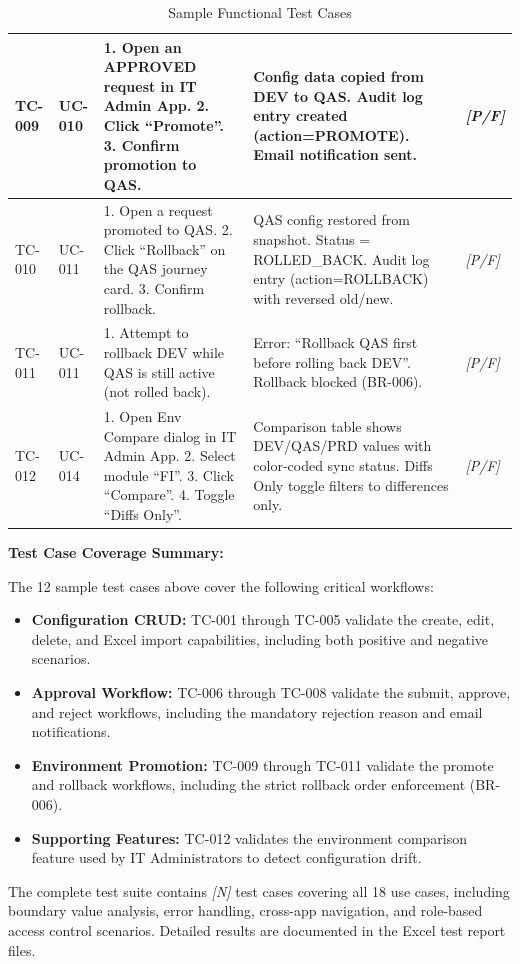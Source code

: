 \documentclass[12pt,a4paper]{report}
\newcommand{\placeholder}[1]{\textcolor{placeholderblue}{\textit{[#1]}}}
\begin{document}
\begin{table}[H]
\begin{tabularx}{\textwidth}{|l|l|X|X|l|}
  TC-009 & UC-010 & 1. Open an APPROVED request in IT Admin App. 2. Click ``Promote''. 3. Confirm promotion to QAS. & Config data copied from DEV to QAS. Audit log entry created (action=PROMOTE). Email notification sent. & \placeholder{P/F} \\ \hline
  TC-010 & UC-011 & 1. Open a request promoted to QAS. 2. Click ``Rollback'' on the QAS journey card. 3. Confirm rollback. & QAS config restored from snapshot. Status = ROLLED\_BACK. Audit log entry (action=ROLLBACK) with reversed old/new. & \placeholder{P/F} \\ \hline
  TC-011 & UC-011 & 1. Attempt to rollback DEV while QAS is still active (not rolled back). & Error: ``Rollback QAS first before rolling back DEV''. Rollback blocked (BR-006). & \placeholder{P/F} \\ \hline
  TC-012 & UC-014 & 1. Open Env Compare dialog in IT Admin App. 2. Select module ``FI''. 3. Click ``Compare''. 4. Toggle ``Diffs Only''. & Comparison table shows DEV/QAS/PRD values with color-coded sync status. Diffs Only toggle filters to differences only. & \placeholder{P/F} \\ \hline
\end{tabularx}
\caption{Sample Functional Test Cases}
\label{tab:sample-test-cases}
\end{table}

\noindent\textbf{Test Case Coverage Summary:}

The 12 sample test cases above cover the following critical workflows:
\begin{itemize}[leftmargin=2em]
  \item \textbf{Configuration CRUD:} TC-001 through TC-005 validate the create, edit, delete, and Excel import capabilities, including both positive and negative scenarios.
  \item \textbf{Approval Workflow:} TC-006 through TC-008 validate the submit, approve, and reject workflows, including the mandatory rejection reason and email notifications.
  \item \textbf{Environment Promotion:} TC-009 through TC-011 validate the promote and rollback workflows, including the strict rollback order enforcement (BR-006).
  \item \textbf{Supporting Features:} TC-012 validates the environment comparison feature used by IT Administrators to detect configuration drift.
\end{itemize}

The complete test suite contains \placeholder{N} test cases covering all 18 use cases, including boundary value analysis, error handling, cross-app navigation, and role-based access control scenarios. Detailed results are documented in the Excel test report files.
\end{document}
